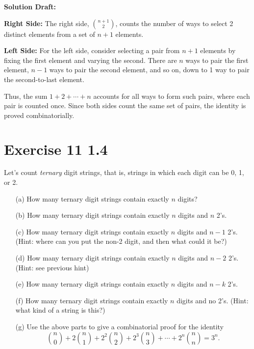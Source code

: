 \documentclass{article}
\begin{document}
\vspace{0.5cm}
\noindent\textbf{Solution Draft:} 
\vspace{0.2cm}

\textbf{Right Side:} The right side, \( \binom{n+1}{2} \), counts the number of ways to select 2 distinct elements from a set of \( n+1 \) elements.

\textbf{Left Side:} For the left side, consider selecting a pair from \( n+1 \) elements by fixing the first element and varying the second. There are \( n \) ways to pair the first element, \( n-1 \) ways to pair the second element, and so on, down to 1 way to pair the second-to-last element.


Thus, the sum \( 1 + 2 + \cdots + n \) accounts for all ways to form such pairs, where each pair is counted once. Since both sides count the same set of pairs, the identity is proved combinatorially.


\section*{Exercise 11 1.4}  

Let's count \textit{ternary} digit strings, that is, strings in which each digit can be 0, 1, or 2.

\begin{enumerate}
    \item[(a)] How many ternary digit strings contain exactly \( n \) digits?
    \item[(b)] How many ternary digit strings contain exactly \( n \) digits and \( n \) 2's.
    \item[(c)] How many ternary digit strings contain exactly \( n \) digits and \( n - 1 \) 2's. (Hint: where can you put the non-2 digit, and then what could it be?)
    \item[(d)] How many ternary digit strings contain exactly \( n \) digits and \( n - 2 \) 2's. (Hint: see previous hint)
    \item[(e)] How many ternary digit strings contain exactly \( n \) digits and \( n - k \) 2's.
    \item[(f)] How many ternary digit strings contain exactly \( n \) digits and no 2's. (Hint: what kind of a string is this?)
    \item[(g)] Use the above parts to give a combinatorial proof for the identity
    \[
    \binom{n}{0} + 2\binom{n}{1} + 2^2\binom{n}{2} + 2^3\binom{n}{3} + \cdots + 2^n\binom{n}{n} = 3^n.
    \]
\end{enumerate}
\end{document}
